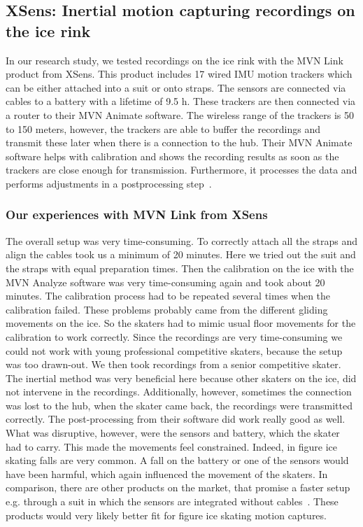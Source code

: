 \subsection{XSens: Inertial motion capturing recordings on the ice rink}
In our research study, we tested recordings on the ice rink with the MVN Link product from XSens.
This product includes 17 wired IMU motion trackers which can be either attached into a suit or onto straps.
The sensors are connected via cables to a battery with a lifetime of 9.5 h.
These trackers are then connected via a router to their MVN Animate software.
The wireless range of the trackers is 50 to 150 meters, however, the trackers are able to buffer the recordings
and transmit these later when there is a connection to the hub.
Their MVN Animate software helps with calibration and shows the recording results as soon as the trackers are close
enough
for transmission.
Furthermore, it processes the data and performs adjustments in a postprocessing step~\cite{xsensmvnanimate}.



\subsubsection*{Our experiences with MVN Link from XSens}
The overall setup was very time-consuming. To correctly attach all the straps and align the cables took us a
minimum of 20 minutes. Here we tried out the suit and the straps with equal preparation times.
Then the calibration on the ice with the MVN Analyze software was very time-consuming again and took about 20 minutes.
The calibration process had to be repeated several times when the calibration failed.
These problems probably came from the different gliding movements on the ice.
So the skaters had to mimic usual floor movements for the calibration to work correctly.
Since the recordings are very time-consuming we could not work with young professional competitive skaters, because
the setup was too drawn-out.
We then took recordings from a senior competitive skater. The inertial method was very beneficial here because other
skaters on the ice, did not intervene in the recordings. Additionally, however, sometimes the connection was lost to
the hub, when the skater came back, the recordings were transmitted correctly.
The post-processing from their software did work really good as well.
What was disruptive, however, were the sensors and battery, which the skater had to carry.
This made the movements feel constrained. Indeed, in figure ice skating falls are very common.
A fall on the battery or one of the sensors would have been harmful, which again influenced the movement of the
skaters.
In comparison, there are other products on the market, that promise a faster setup e.g. through a suit in which the
sensors
are integrated without cables~\cite{mocapinterialneuron}. These products would very likely better fit for figure ice
skating
motion captures.



